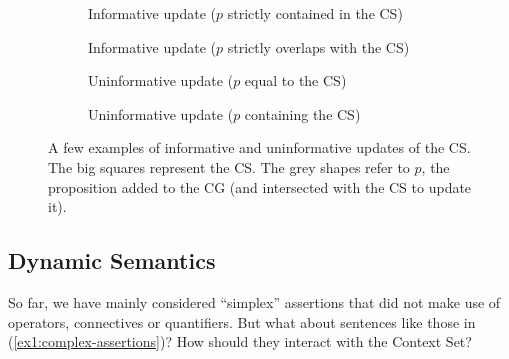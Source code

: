 \begin{figure}[H]
	\centering
	\begin{subfigure}[b]{.23\linewidth}
		\centering
		\caption{Informative update ($p$ strictly contained in the CS)}\label{fig1:contained-update}
	\end{subfigure}\hfill
	\begin{subfigure}[b]{.23\linewidth}
		\centering
		\caption{Informative update ($p$ strictly overlaps with the CS)}\label{fig1:informative-update}
	\end{subfigure}\hfill
	\begin{subfigure}[b]{.23\linewidth}
		\centering
		\caption{Uninformative update ($p$ equal to the CS)}\label{fig1:uninformative-equal-update}
	\end{subfigure}\hfill
	\begin{subfigure}[b]{.23\linewidth}
		\centering
		\caption{Uninformative update ($p$ containing the CS)}\label{fig1:uninformative-update}
	\end{subfigure}
	\caption{A few examples of informative and uninformative updates of the CS. The big squares represent the CS. The grey shapes refer to $p$, the proposition added to the CG (and intersected with the CS to update it).}\label{fig1:informative-assertions}
\end{figure}

\subsection{Dynamic Semantics}

So far, we have mainly considered ``simplex'' assertions that did not make use of operators, connectives or quantifiers. But what about sentences like those in (\ref{ex1:complex-assertions})? How should they interact with the Context Set?
\begin{exe}
	\ex \label{ex1:complex-assertions}
	\begin{xlist}
	\end{xlist}
\end{exe}

